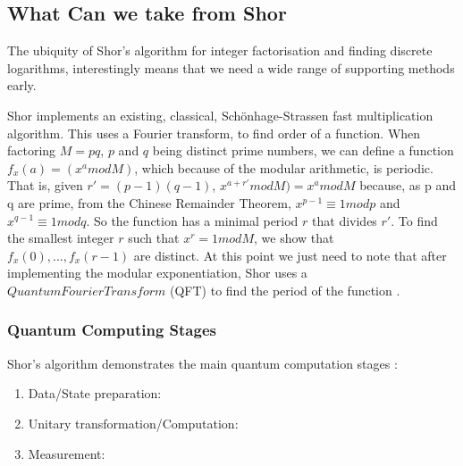 

\subsection{What Can we take from Shor}

The ubiquity of Shor's algorithm for integer factorisation and finding discrete logarithms,
interestingly means that we need a wide range of supporting methods early.  

Shor implements an existing, classical, Sch\"{o}nhage-Strassen fast multiplication algorithm.
This uses a Fourier transform, to find order of a function.  
When factoring $M = pq$, $p$ and $q$ being distinct prime numbers,
we can define a function $f_x(a) = (x^a mod M)$, which because of the modular arithmetic, is periodic.
That is, given $r' = (p-1)(q-1)$, $x^{a+r'} mod M) = x^a mod M$ because, as p and q are prime, 
from the Chinese Remainder Theorem, $x^{p-1} \equiv 1 mod p$ and  $x^{q-1} \equiv 1 mod q$.
So the function has a minimal period $r$ that divides $r'$.  
To find the smallest integer $r$ such that $x^r = 1 mod M$, 
we show that $f_x(0),..., f_x(r-1)$ are distinct.  
At this point we just need to note that after implementing the modular exponentiation,
Shor uses a $Quantum Fourier Transform$ (QFT) to find the period of the function \cite{Shor:1994}. 

\subsubsection{Quantum Computing Stages}

Shor's algorithm demonstrates the main quantum computation stages \cite{Nielsen:2010}:

\begin{enumerate}
	\item Data/State preparation: 
	
	\item Unitary transformation/Computation:
	
	\item Measurement: 
	
\end{enumerate}

